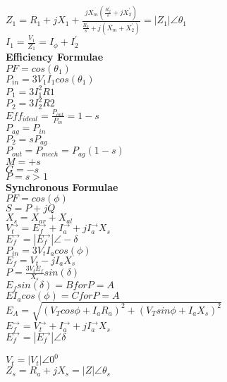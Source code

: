 \documentclass[a4paper, 10pt]{article}
\begin{document}
\begin{paracol}{3}[]
$Z_1=R_1+jX_1+\frac{jX_m(\frac{R_{2}^{'}}{s}+jX_{2}^{'})}{\frac{R_{2}^{'}}{s}+j(X_m+X_{2}^{'})}=|Z_1|\angle \theta_1$\\
$I_1=\frac{V_1}{Z_1}=I_\phi + I_{2}^{'}$\\

\textbf{Efficiency Formulae}\\
$PF=cos(\theta_1)$\\
$P_{in}=3V_1I_1cos(\theta_1)$\\
$P_1=3I_1^2R1$\\
$P_2=3I_2^2R2$\\

$Eff_{ideal}=\frac{P_{out}}{P_{in}}=1-s$\\
$P_{ag}=P_{in}$\\
$P_2=sP_{ag}$\\
$P_{out}=P_{mech}=P_{ag}(1-s)$\\

$M=+s$\\
$G=-s$\\
$P=s>1$\\

\textbf{Synchronous Formulae}\\
$PF=cos(\phi)$\\
$S=P+jQ$\\

$X_s=X_{ar}+X_{al}$\\

$V_t^\rightarrow = E_f^\rightarrow + I_a^\rightarrow + jI_a^\rightarrow X_s$\\
$E_f^\rightarrow=|E_f^\rightarrow|\angle -\delta$\\

$P_{in}=3V_tI_a cos(\phi)$\\
$E_f = V_t - jI_aX_s$\\
$P=\frac{3V_tE_f}{X_s}sin(\delta)$\\
$E_f sin(\delta) = B for P = A$\\
$EI_a cos(\phi) = C for P = A$\\
$E_A=\sqrt{(V_T cos\phi + I_a R_a)^2 + (V_T sin\phi + I_a X_s)^2}$\\

$E_f^\rightarrow = V_t^\rightarrow + I_a^\rightarrow + jI_a^\rightarrow X_s$\\
$E_f^\rightarrow=|E_f^\rightarrow|\angle \delta$\\

\switchcolumn

$V_t=|V_t|\angle 0^0$\\
$Z_s = R_a +j X_s = |Z|\angle \theta_s$\\


\end{paracol}
\end{document}
